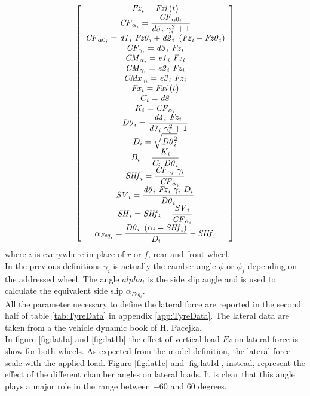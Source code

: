 \begin{equation}
    \left[ \begin {array}{c} {\it Fz}_{i} ={\it Fzi} \left(t \right)
    \\ \displaystyle {\it CF}_{\alpha_{i}} =\frac{{\it CF}_{\alpha0_{i
    }} }{{\it d5}_{i} ~\gamma_{i} ^{2}+1}\\ {\it CF}_{
    \alpha0_{i}} ={\it d1}_{i} ~{\it Fz0}_{i} +{\it d2}_{i} ~\left({\it Fz
    }_{i} -{\it Fz0}_{i} \right)\\ {\it CF}_{\gamma_{i}}
     ={\it d3}_{i} ~{\it Fz}_{i} \\ {\it CM}_{\alpha_{i}
    } ={\it e1}_{i} ~{\it Fz}_{i} \\ {\it CM}_{\gamma_{i
    }} ={\it e2}_{i} ~{\it Fz}_{i} \\ {\it CMx}_{\gamma_
    {i}} ={\it e3}_{i} ~{\it Fz}_{i} \\ {\it Fx}_{i} ={
    \it Fxi} \left(t \right)\\ C_{i} ={\it d8} 
    \\ K_{i} ={\it CF}_{\alpha_{i}} 
    \\ \displaystyle {\it D0}_{i} =\frac{{\it d4}_{i} ~{\it Fz}_{i} }{
    {\it d7}_{i} ~\gamma_{i} ^{2}+1}\\ D_{i} =\sqrt{{
    \it D0}_{i} ^{2}}\\ \displaystyle B_{i} =\frac{K_{i} }{C_{i} ~{
    \it D0}_{i} }\\ \displaystyle {\it SHf}_{i} =\frac{{\it CF}_{
    \gamma_{i}} ~\gamma_{i} }{{\it CF}_{\alpha_{i}} }\\ 
    \displaystyle {\it SV}_{i} =\frac{{\it d6}_{i} ~{\it Fz}_{i} ~\gamma_{i} ~D_{i} }{{
    \it D0}_{i} }\\ \displaystyle {\it SH}_{i} ={\it SHf}_{i} -\frac{{
    \it SV}_{i} }{{\it CF}_{\alpha_{i}} }\\ \displaystyle \alpha_{{
    \it Feq}_{i}} =\frac{{\it D0}_{i} ~\left(\alpha_{i} -{\it SHf}_{i} 
    \right)}{D_{i} }-{\it SHf}_{i} \end {array} \right]    
\end{equation}
%
where $i$ is everywhere in place of $r$ or $f$, rear and front wheel.\\
In the previous definitions $\gamma_i$ is actually the camber angle $\phi$ or $\phi_f$ depending on the addressed wheel. The angle $alpha_i$ is the side slip angle and is used to calculate the equivalent side slip $\alpha_{Feq_i}$.\\
All the parameter necessary to define the lateral force are reported in the second half of table \ref{tab:TyreData} in appendix \ref{app:TyreData}. The lateral data are taken from a the vehicle dynamic book of H. Pacejka.\cite{pacejka2012tire}\\
In figure \ref{fig:lat1a} and \ref{fig:lat1b} the effect of vertical load $Fz$ on lateral force is show for both wheels. As expected from the model definition, the lateral force scale with the applied load. Figure \ref{fig:lat1c} and \ref{fig:lat1d}, instead, represent the effect of the different chamber angles on lateral loads. It is clear that this angle plays a major role in the range between $-60$ and $60$ degrees. 
%
